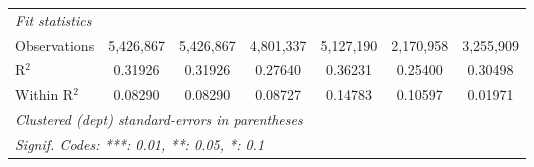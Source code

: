 \begin{table}[htbp]
\begin{adjustbox}{max width=\textwidth}
\begin{tabular}{lcccccc}
      \midrule
      \emph{Fit statistics}\\
      Observations     & 5,426,867       & 5,426,867       & 4,801,337       & 5,127,190       & 2,170,958       & 3,255,909\\  
      R$^2$            & 0.31926         & 0.31926         & 0.27640         & 0.36231         & 0.25400         & 0.30498\\  
      Within R$^2$     & 0.08290         & 0.08290         & 0.08727         & 0.14783         & 0.10597         & 0.01971\\  
      \midrule \midrule
      \multicolumn{7}{l}{\emph{Clustered (dept) standard-errors in parentheses}}\\
      \multicolumn{7}{l}{\emph{Signif. Codes: ***: 0.01, **: 0.05, *: 0.1}}\\
   \end{tabular}
   \end{adjustbox}
\end{table}
